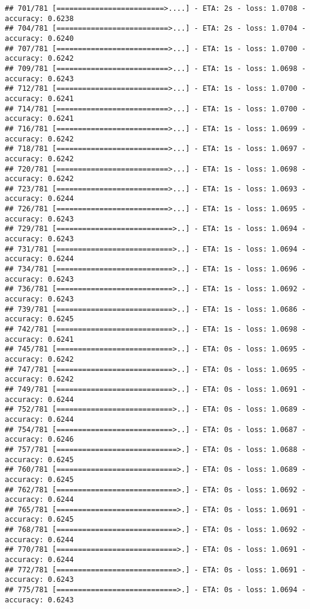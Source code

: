 \documentclass[
]{article}
\begin{document}
\begin{verbatim}
## 701/781 [=========================>....] - ETA: 2s - loss: 1.0708 - accuracy: 0.6238
## 704/781 [==========================>...] - ETA: 2s - loss: 1.0704 - accuracy: 0.6240
## 707/781 [==========================>...] - ETA: 1s - loss: 1.0700 - accuracy: 0.6242
## 709/781 [==========================>...] - ETA: 1s - loss: 1.0698 - accuracy: 0.6243
## 712/781 [==========================>...] - ETA: 1s - loss: 1.0700 - accuracy: 0.6241
## 714/781 [==========================>...] - ETA: 1s - loss: 1.0700 - accuracy: 0.6241
## 716/781 [==========================>...] - ETA: 1s - loss: 1.0699 - accuracy: 0.6242
## 718/781 [==========================>...] - ETA: 1s - loss: 1.0697 - accuracy: 0.6242
## 720/781 [==========================>...] - ETA: 1s - loss: 1.0698 - accuracy: 0.6242
## 723/781 [==========================>...] - ETA: 1s - loss: 1.0693 - accuracy: 0.6244
## 726/781 [==========================>...] - ETA: 1s - loss: 1.0695 - accuracy: 0.6243
## 729/781 [===========================>..] - ETA: 1s - loss: 1.0694 - accuracy: 0.6243
## 731/781 [===========================>..] - ETA: 1s - loss: 1.0694 - accuracy: 0.6244
## 734/781 [===========================>..] - ETA: 1s - loss: 1.0696 - accuracy: 0.6243
## 736/781 [===========================>..] - ETA: 1s - loss: 1.0692 - accuracy: 0.6243
## 739/781 [===========================>..] - ETA: 1s - loss: 1.0686 - accuracy: 0.6245
## 742/781 [===========================>..] - ETA: 1s - loss: 1.0698 - accuracy: 0.6241
## 745/781 [===========================>..] - ETA: 0s - loss: 1.0695 - accuracy: 0.6242
## 747/781 [===========================>..] - ETA: 0s - loss: 1.0695 - accuracy: 0.6242
## 749/781 [===========================>..] - ETA: 0s - loss: 1.0691 - accuracy: 0.6244
## 752/781 [===========================>..] - ETA: 0s - loss: 1.0689 - accuracy: 0.6244
## 754/781 [===========================>..] - ETA: 0s - loss: 1.0687 - accuracy: 0.6246
## 757/781 [============================>.] - ETA: 0s - loss: 1.0688 - accuracy: 0.6245
## 760/781 [============================>.] - ETA: 0s - loss: 1.0689 - accuracy: 0.6245
## 762/781 [============================>.] - ETA: 0s - loss: 1.0692 - accuracy: 0.6244
## 765/781 [============================>.] - ETA: 0s - loss: 1.0691 - accuracy: 0.6245
## 768/781 [============================>.] - ETA: 0s - loss: 1.0692 - accuracy: 0.6244
## 770/781 [============================>.] - ETA: 0s - loss: 1.0691 - accuracy: 0.6244
## 772/781 [============================>.] - ETA: 0s - loss: 1.0691 - accuracy: 0.6243
## 775/781 [============================>.] - ETA: 0s - loss: 1.0694 - accuracy: 0.6243

\end{verbatim}
\end{document}
